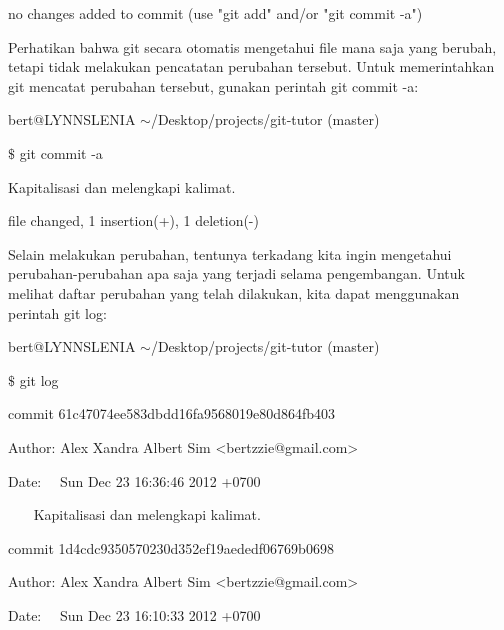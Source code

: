 {\fontsize{10pt}{10pt}\selectfont no changes added to commit (use "git add" and/or "git commit -a")} \par
\vspace{12pt}
Perhatikan bahwa git secara otomatis mengetahui file mana saja yang berubah, tetapi tidak melakukan pencatatan perubahan tersebut. Untuk memerintahkan git mencatat perubahan tersebut, gunakan perintah git commit -a: \par
{\fontsize{10pt}{10pt}\selectfont bert@LYNNSLENIA  $  \sim  $/Desktop/projects/git-tutor (master)} \par
{\fontsize{10pt}{10pt}\selectfont  $  \$  $ git commit -a} \par
{\fontsize{10pt}{10pt}\selectfont [master 61c4707] Kapitalisasi dan melengkapi kalimat.} \par
{\fontsize{10pt}{10pt} file changed, 1 insertion(+), 1 deletion(-)} \par
\vspace{12pt}
Selain melakukan perubahan, tentunya terkadang kita ingin mengetahui perubahan-perubahan apa saja yang terjadi selama pengembangan. Untuk melihat daftar perubahan yang telah dilakukan, kita dapat menggunakan perintah git log: \par
\noindent 
{\fontsize{10pt}{10pt}\selectfont bert@LYNNSLENIA  $  \sim  $/Desktop/projects/git-tutor (master)} \par
\noindent 
{\fontsize{10pt}{10pt}\selectfont  $  \$  $ git log} \par
\noindent 
{\fontsize{10pt}{10pt}\selectfont commit 61c47074ee583dbdd16fa9568019e80d864fb403} \par
\noindent 
{\fontsize{10pt}{10pt}\selectfont Author: Alex Xandra Albert Sim <bertzzie@gmail.com>} \par
\noindent 
{\fontsize{10pt}{10pt}\selectfont Date:~~ Sun Dec 23 16:36:46 2012 +0700} \par
\noindent 
\vspace{10pt}
\noindent 
{\fontsize{10pt}{10pt}\selectfont ~~~ Kapitalisasi dan melengkapi kalimat.} \par
\noindent 
\vspace{10pt}
\noindent 
{\fontsize{10pt}{10pt}\selectfont commit 1d4cdc9350570230d352ef19aededf06769b0698} \par
\noindent 
{\fontsize{10pt}{10pt}\selectfont Author: Alex Xandra Albert Sim <bertzzie@gmail.com>} \par
\noindent 
{\fontsize{10pt}{10pt}\selectfont Date:~~ Sun Dec 23 16:10:33 2012 +0700} \par
